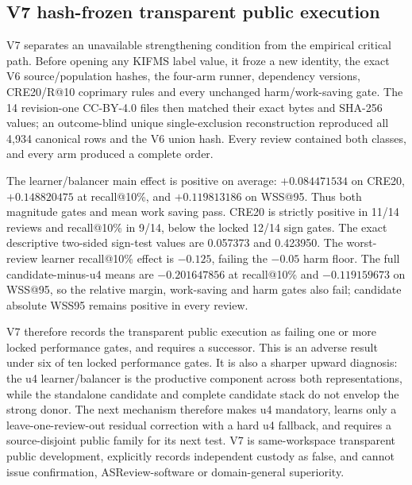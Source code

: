 \subsection{V7 hash-frozen transparent public execution}

V7 separates an unavailable strengthening condition from the empirical
critical path. Before opening any KIFMS label value, it froze a new identity,
the exact V6 source/population hashes, the four-arm runner, dependency versions,
CRE20/R@10 coprimary rules and every unchanged harm/work-saving gate. The 14
revision-one CC-BY-4.0 files then matched their exact bytes and SHA-256 values;
an outcome-blind unique single-exclusion reconstruction reproduced all 4,934
canonical rows and the V6 union hash. Every review contained both
 classes, and every arm produced a complete order.

The learner/balancer main effect is positive on average: $+0.084471534$ on
CRE20, $+0.148820475$ at recall@10\%, and $+0.119813186$ on WSS@95. Thus both
magnitude gates and mean work saving pass. CRE20 is strictly positive in 11/14
reviews and recall@10\% in 9/14, below the locked 12/14 sign gates. The exact
descriptive two-sided sign-test values are 0.057373 and 0.423950. The
worst-review learner recall@10\% effect is $-0.125$, failing the $-0.05$ harm
floor. The full candidate-minus-u4 means are $-0.201647856$ at recall@10\% and
$-0.119159673$ on WSS@95, so the relative margin, work-saving and harm gates
also fail; candidate absolute WSS95 remains positive in every review.

V7 therefore records the transparent public execution as failing one or more locked performance gates, and requires a successor.
This is an adverse result under six of ten locked performance gates. It is also
a sharper upward diagnosis: the u4 learner/balancer is the productive component
across both representations, while the standalone candidate and complete
candidate stack do not envelop the strong donor. The next mechanism therefore
makes u4 mandatory, learns only a leave-one-review-out residual correction with
a hard u4 fallback, and requires a source-disjoint public family for its next
test. V7 is same-workspace transparent public development, explicitly records
independent custody as false, and cannot issue confirmation, ASReview-software
or domain-general superiority.
